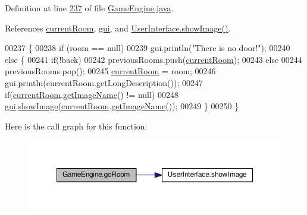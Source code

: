 Definition at line \hyperlink{GameEngine_8java_source_l00237}{237} of file \hyperlink{GameEngine_8java_source}{Game\-Engine.\-java}.



References \hyperlink{GameEngine_8java_source_l00021}{current\-Room}, \hyperlink{GameEngine_8java_source_l00031}{gui}, and \hyperlink{UserInterface_8java_source_l00069}{User\-Interface.\-show\-Image()}.


\begin{DoxyCode}
00237                                                  \{
00238         \textcolor{keywordflow}{if} (room == null)
00239             gui.println(\textcolor{stringliteral}{"There is no door!"});
00240         \textcolor{keywordflow}{else} \{
00241             \textcolor{keywordflow}{if}(!back)
00242                 previousRooms.push(\hyperlink{classGameEngine_aa08e7cbb458047a2f72ff594d2e230bc}{currentRoom});
00243             \textcolor{keywordflow}{else}
00244                 previousRooms.pop();
00245             \hyperlink{classGameEngine_aa08e7cbb458047a2f72ff594d2e230bc}{currentRoom} = room;
00246             gui.println(currentRoom.getLongDescription());
00247             \textcolor{keywordflow}{if}(\hyperlink{classGameEngine_aa08e7cbb458047a2f72ff594d2e230bc}{currentRoom}.\hyperlink{classRoom_a8177668df4d8be718812934673c42649}{getImageName}() != null)
00248                 \hyperlink{classGameEngine_a2a7d0bb6183b3f3ef3ee2008926374a0}{gui}.\hyperlink{classUserInterface_ab793a0f12878c698ba3e1720a9f86f3b}{showImage}(\hyperlink{classGameEngine_aa08e7cbb458047a2f72ff594d2e230bc}{currentRoom}.\hyperlink{classRoom_a8177668df4d8be718812934673c42649}{getImageName}());
00249         \}
00250     \}
\end{DoxyCode}


Here is the call graph for this function\-:
\nopagebreak
\begin{figure}[H]
\begin{center}
\leavevmode
\includegraphics[width=350pt]{classGameEngine_ae847246e53c53b84787eec490aedf9ad_cgraph}
\end{center}
\end{figure}


